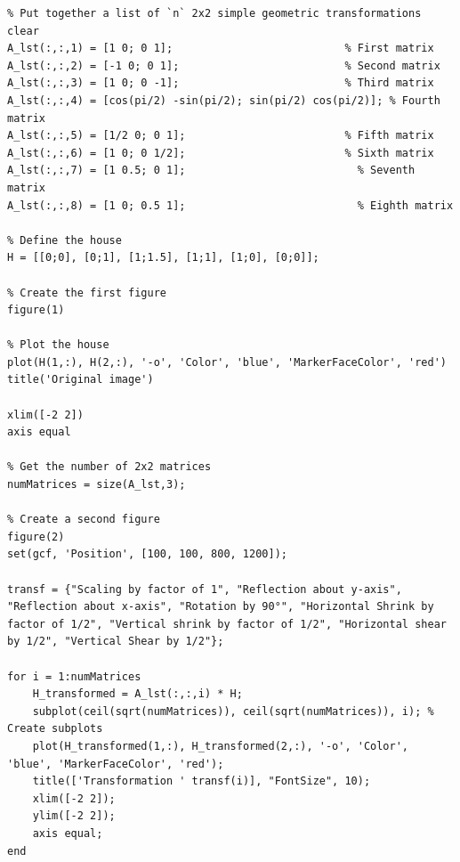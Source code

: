 \documentclass{article}
\begin{document}
\begin{verbatim}
% Put together a list of `n` 2x2 simple geometric transformations
clear
A_lst(:,:,1) = [1 0; 0 1];                           % First matrix
A_lst(:,:,2) = [-1 0; 0 1];                          % Second matrix
A_lst(:,:,3) = [1 0; 0 -1];                          % Third matrix
A_lst(:,:,4) = [cos(pi/2) -sin(pi/2); sin(pi/2) cos(pi/2)]; % Fourth matrix
A_lst(:,:,5) = [1/2 0; 0 1];                         % Fifth matrix
A_lst(:,:,6) = [1 0; 0 1/2];                         % Sixth matrix
A_lst(:,:,7) = [1 0.5; 0 1];                           % Seventh matrix
A_lst(:,:,8) = [1 0; 0.5 1];                           % Eighth matrix

% Define the house
H = [[0;0], [0;1], [1;1.5], [1;1], [1;0], [0;0]];

% Create the first figure
figure(1)

% Plot the house
plot(H(1,:), H(2,:), '-o', 'Color', 'blue', 'MarkerFaceColor', 'red')
title('Original image')

xlim([-2 2])
axis equal

% Get the number of 2x2 matrices
numMatrices = size(A_lst,3);

% Create a second figure
figure(2)
set(gcf, 'Position', [100, 100, 800, 1200]);

transf = {"Scaling by factor of 1", "Reflection about y-axis", "Reflection about x-axis", "Rotation by 90°", "Horizontal Shrink by factor of 1/2", "Vertical shrink by factor of 1/2", "Horizontal shear by 1/2", "Vertical Shear by 1/2"};

for i = 1:numMatrices
    H_transformed = A_lst(:,:,i) * H;
    subplot(ceil(sqrt(numMatrices)), ceil(sqrt(numMatrices)), i); % Create subplots
    plot(H_transformed(1,:), H_transformed(2,:), '-o', 'Color', 'blue', 'MarkerFaceColor', 'red');
    title(['Transformation ' transf(i)], "FontSize", 10);
    xlim([-2 2]);
    ylim([-2 2]);
    axis equal;
end
\end{verbatim}
\end{document}

